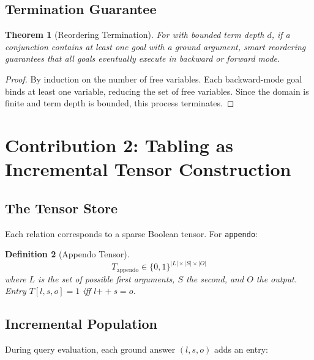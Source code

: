 \documentclass[11pt,a4paper]{article}
\newtheorem{theorem}{Theorem}
\newtheorem{definition}[theorem]{Definition}
\begin{document}
\subsection{Termination Guarantee}
\label{subsec:termination_guarantee_chirho}

\begin{theorem}[Reordering Termination]
\label{thm:reordering_termination_chirho}
For \fdmk with bounded term depth $d$, if a conjunction contains at least
one goal with a ground argument, smart reordering guarantees that all goals
eventually execute in backward or forward mode.
\end{theorem}

\begin{proof}
By induction on the number of free variables. Each backward-mode goal binds
at least one variable, reducing the set of free variables. Since the domain
is finite and term depth is bounded, this process terminates.
\end{proof}

\section{Contribution 2: Tabling as Incremental Tensor Construction}
\label{sec:tensor_chirho}

\subsection{The Tensor Store}
\label{subsec:tensor_store_chirho}

Each relation corresponds to a sparse Boolean tensor. For \texttt{appendo}:

\begin{definition}[Appendo Tensor]
\label{def:appendo_tensor_chirho}
\[
T_{\text{appendo}} \in \{0,1\}^{|L| \times |S| \times |O|}
\]
where $L$ is the set of possible first arguments, $S$ the second, and $O$
the output. Entry $T[l, s, o] = 1$ iff $l \mathbin{++} s = o$.
\end{definition}

\subsection{Incremental Population}
\label{subsec:incremental_chirho}

During query evaluation, each ground answer $(l, s, o)$ adds an entry:
\end{document}
